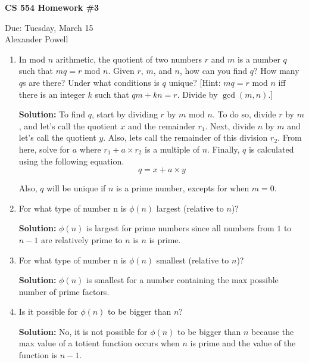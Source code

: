 \documentclass[11pt]{article}
\begin{document}
\begin{center}             %
\begin{LARGE}
{\bf CS 554 Homework \#3}
\end{LARGE}
\vskip 0.25cm      %

Due: Tuesday, March 15\\  %
Alexander Powell
\end{center}
\begin{enumerate}

\item In mod $n$ arithmetic, the quotient of two numbers $r$ and $m$ is a number $q$ such that $mq = r \text{ mod } n$. Given $r$, $m$, and $n$, how can you find $q$? How many $q$s are there? Under what conditions is $q$ unique? [Hint: $mq = r \text{ mod } n$ iff there is an integer $k$ such that $qm + kn = r$. Divide by $\gcd(m,n)$.]

\textbf{Solution: }
To find $q$, start by dividing $r$ by $m$ mod $n$.  To do so, divide $r$ by $m$, and let's call the quotient $x$ and the remainder $r_1$.  Next, divide $n$ by $m$ and let's call the quotient $y$.  Also, lets call the remainder of this division $r_2$.  From here, solve for $a$ where $r_1 + a \times r_2$ is a multiple of $n$.  Finally, $q$ is calculated using the following equation.  
$$ q = x + a \times y $$

Also, $q$ will be unique if $n$ is a prime number, excepts for when $m = 0$.  

\item For what type of number n is $\phi(n)$ largest (relative to $n$)?

\textbf{Solution: }
$\phi(n)$ is largest for prime numbers since all numbers from $1$ to $n-1$ are relatively prime to $n$ is $n$ is prime.  

\item For what type of number n is $\phi(n)$ smallest (relative to $n$)?

\textbf{Solution: }
$\phi(n)$ is smallest for a number containing the max possible number of prime factors.  

\item Is it possible for $\phi(n)$ to be bigger than $n$?

\textbf{Solution: }
No, it is not possible for $\phi(n)$ to be bigger than $n$ because the max value of a totient function occurs when $n$ is prime and the value of the function is $n - 1$.  


\end{enumerate}
\end{document}
